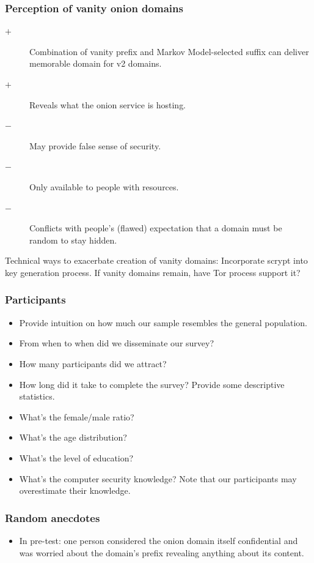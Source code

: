 \subsubsection{Perception of vanity onion domains}
\begin{description}
    \item[$+$] Combination of vanity prefix and Markov Model-selected suffix can
        deliver memorable domain for v2 domains.
    \item[$+$] Reveals what the onion service is hosting.
    \item[$-$] May provide false sense of security.
    \item[$-$] Only available to people with resources.
    \item[$-$] Conflicts with people's (flawed) expectation that a domain must
        be random to stay hidden.
\end{description}

Technical ways to exacerbate creation of vanity domains: Incorporate scrypt into
key generation process.
If vanity domains remain, have Tor process support it?

\subsubsection{Participants}
\begin{itemize}
    \item Provide intuition on how much our sample resembles the general
        population.
    \item From when to when did we disseminate our survey?
    \item How many participants did we attract?
    \item How long did it take to complete the survey?  Provide some descriptive statistics.
    \item What's the female/male ratio?
    \item What's the age distribution?
    \item What's the level of education?
    \item What's the computer security knowledge?  Note that our participants
        may overestimate their knowledge.
\end{itemize}

\subsubsection{Random anecdotes}
\begin{itemize}
    \item In pre-test: one person considered the onion domain itself
        confidential and was worried about the domain's prefix revealing
        anything about its content.
\end{itemize}
